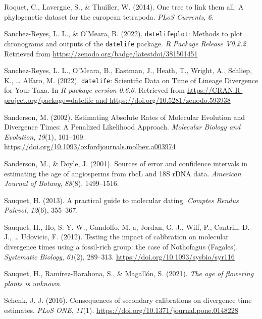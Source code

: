 \documentclass[english,man]{apa6}
\begin{document}
\leavevmode\hypertarget{ref-roquet2014one}{}%
Roquet, C., Lavergne, S., \& Thuiller, W. (2014). One tree to link them all: A phylogenetic dataset for the european tetrapoda. \emph{PLoS Currents}, \emph{6}.

\leavevmode\hypertarget{ref-datelifeplot}{}%
Sanchez-Reyes, L. L., \& O'Meara, B. (2022). \texttt{datelifeplot}: Methods to plot chronograms and outputs of the \texttt{datelife} package. \emph{R Package Release V0.2.2}. Retrieved from \url{https://zenodo.org/badge/latestdoi/381501451}

\leavevmode\hypertarget{ref-sanchez2022}{}%
Sanchez-Reyes, L. L., O'Meara, B., Eastman, J., Heath, T., Wright, A., Schliep, K., \ldots{} Alfaro, M. (2022). \texttt{datelife}: Scientific Data on Time of Lineage Divergence for Your Taxa. In \emph{R package version 0.6.6}. Retrieved from \href{https://CRAN.R-project.org/package=datelife\%20and\%20https://doi.org/10.5281/zenodo.593938}{https://CRAN.R-project.org/package=datelife and https://doi.org/10.5281/zenodo.593938}

\leavevmode\hypertarget{ref-sanderson2002}{}%
Sanderson, M. (2002). Estimating Absolute Rates of Molecular Evolution and Divergence Times: A Penalized Likelihood Approach. \emph{Molecular Biology and Evolution}, \emph{19}(1), 101--109. \url{https://doi.org/10.1093/oxfordjournals.molbev.a003974}

\leavevmode\hypertarget{ref-sanderson2001sources}{}%
Sanderson, M., \& Doyle, J. (2001). Sources of error and confidence intervals in estimating the age of angiosperms from rbcL and 18S rDNA data. \emph{American Journal of Botany}, \emph{88}(8), 1499--1516.

\leavevmode\hypertarget{ref-sauquet2013practical}{}%
Sauquet, H. (2013). A practical guide to molecular dating. \emph{Comptes Rendus Palevol}, \emph{12}(6), 355--367.

\leavevmode\hypertarget{ref-sauquet2012testing}{}%
Sauquet, H., Ho, S. Y. W., Gandolfo, M. a, Jordan, G. J., Wilf, P., Cantrill, D. J., \ldots{} Udovicic, F. (2012). Testing the impact of calibration on molecular divergence times using a fossil-rich group: the case of Nothofagus (Fagales). \emph{Systematic Biology}, \emph{61}(2), 289--313. \url{https://doi.org/10.1093/sysbio/syr116}

\leavevmode\hypertarget{ref-sauquet2021age}{}%
Sauquet, H., Ramírez-Barahona, S., \& Magallón, S. (2021). \emph{The age of flowering plants is unknown}.

\leavevmode\hypertarget{ref-schenk2016sec}{}%
Schenk, J. J. (2016). Consequences of secondary calibrations on divergence time estimates. \emph{PLoS ONE}, \emph{11}(1). \url{https://doi.org/10.1371/journal.pone.0148228}
\end{document}
